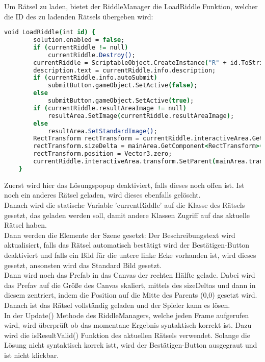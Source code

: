 Um Rätsel zu laden, bietet der RiddleManager die LoadRiddle Funktion, welcher die ID des zu ladenden Rätsels übergeben wird:

\begin{lstlisting}[language=csh, caption={LoadRiddle() Methode des RätselManagers}]
void LoadRiddle(int id) {
        solution.enabled = false;
        if (currentRiddle != null)
            currentRiddle.Destroy();
        currentRiddle = ScriptableObject.CreateInstance("R" + id.ToString("000")) as Riddle;
        description.text = currentRiddle.info.description;
        if (currentRiddle.info.autoSubmit)
            submitButton.gameObject.SetActive(false);
        else
            submitButton.gameObject.SetActive(true);
        if (currentRiddle.resultAreaImage != null)
            resultArea.SetImage(currentRiddle.resultAreaImage);
        else
            resultArea.SetStandardImage();
        RectTransform rectTransform = currentRiddle.interactiveArea.GetComponent<RectTransform>();
        rectTransform.sizeDelta = mainArea.GetComponent<RectTransform>().rect.size;
        rectTransform.position = Vector3.zero;
        currentRiddle.interactiveArea.transform.SetParent(mainArea.transform, false);
    }
\end{lstlisting}
Zuerst wird hier das Lösungspopup deaktiviert, falls dieses noch offen ist. Ist noch ein anderes Rätsel geladen, wird dieses ebenfalls gelöscht.\\
Danach wird die statische Variable 'currentRiddle' auf die Klasse des Rätsels gesetzt, das geladen werden soll, damit andere Klassen Zugriff auf das aktuelle Rätsel haben.\\
Dann werden die Elemente der Szene gesetzt: Der Beschreibungstext wird aktualisiert, falls das Rätsel automatisch bestätigt wird der Bestätigen-Button deaktiviert und falls ein Bild für die untere linke Ecke vorhanden ist, wird dieses gesetzt, ansonsten wird das Standard Bild gesetzt.\\
Dann wird noch das Prefab in das Canvas der rechten Hälfte gelade. Dabei wird das Prefav auf die Größe des Canvas skaliert, mittels des sizeDeltas und dann in diesem zentriert, indem die Position auf die Mitte des Parents (0,0) gesetzt wird.\\
Danach ist das Rätsel vollständig geladen und der Spieler kann es lösen.\\

In der Update() Methode des RiddleManagers, welche jeden Frame aufgerufen wird, wird überprüft ob das momentane Ergebnis syntaktisch korrekt ist. Dazu wird die isResultValid() Funktion des aktuellen Rätsels verwendet. Solange die Lösung nicht syntaktisch korrek istt, wird der Bestätigen-Button ausgegraut und ist nicht klickbar.\\

